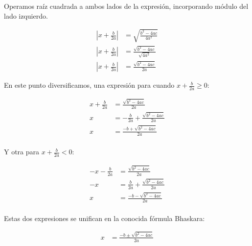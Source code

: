 Operamos raíz cuadrada a ambos lados de la expresión, incorporando módulo del lado izquierdo.

\begin{align*}
	\left|x + \frac{b}{2a}\right| & = \sqrt{\frac{b^2 - 4ac}{4a^2}} \\
	\left|x + \frac{b}{2a}\right| & = \frac{\sqrt{b^2 - 4ac}}{\sqrt{4a^2}} \\
	\left|x + \frac{b}{2a}\right| & = \frac{\sqrt{b^2 - 4ac}}{2a}
\end{align*}

En este punto diversificamos, una expresión para cuando \(x + \frac{b}{2a} \geq 0\):

\begin{align*}
	x + \frac{b}{2a} & = \frac{\sqrt{b^2 - 4ac}}{2a} \\
	x  & =  - \frac{b}{2a} + \frac{\sqrt{b^2 - 4ac}}{2a} \\
	x  & =  \frac{-b + \sqrt{b^2 - 4ac}}{2a} \\
\end{align*}

Y otra para \(x + \frac{b}{2a} < 0\):

\begin{align*}
	- x - \frac{b}{2a} & = \frac{\sqrt{b^2 - 4ac}}{2a} \\
	- x  & = \frac{b}{2a} + \frac{\sqrt{b^2 - 4ac}}{2a} \\
	x  & =  \frac{-b - \sqrt{b^2 - 4ac}}{2a} \\
\end{align*}

Estas dos expresiones se unifican en la conocida fórmula Bhaskara:

\begin{align*}
	x & = \frac{-b \pm \sqrt{b^2 - 4ac}}{2a} \\
\end{align*}
